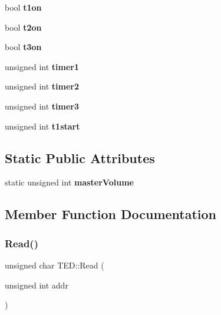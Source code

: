 \begin{DoxyCompactItemize}
\item 
\mbox{\label{class_t_e_d_a5cc45690ae8cb66632d1dd214371b912}} 
bool {\bfseries t1on}
\item 
\mbox{\label{class_t_e_d_a5970c346b3d7d52bde78a500f5aee1f4}} 
bool {\bfseries t2on}
\item 
\mbox{\label{class_t_e_d_a962fb4b04b46b48b5dd36c7a2bc7fb09}} 
bool {\bfseries t3on}
\item 
\mbox{\label{class_t_e_d_a77293433aaf5e876b9b01a767e7e338f}} 
unsigned int {\bfseries timer1}
\item 
\mbox{\label{class_t_e_d_a43098e1aaf59e66098bbfc281e3a58a3}} 
unsigned int {\bfseries timer2}
\item 
\mbox{\label{class_t_e_d_a1c9b720fa1f57c6acbc6cf67b59b6d75}} 
unsigned int {\bfseries timer3}
\item 
\mbox{\label{class_t_e_d_ae07af33401c0df366547f7da11ca08ec}} 
unsigned int {\bfseries t1start}
\end{DoxyCompactItemize}
\subsection*{Static Public Attributes}
\begin{DoxyCompactItemize}
\item 
\mbox{\label{class_t_e_d_a317c1e32175a7a66a1818a859e9b8cbc}} 
static unsigned int {\bfseries master\+Volume}
\end{DoxyCompactItemize}


\subsection{Member Function Documentation}
\mbox{\label{class_t_e_d_a15d3c4cf86452dc0599d6dd504fa832f}} 
\subsubsection{\texorpdfstring{Read()}{Read()}}
{\footnotesize\ttfamily unsigned char T\+E\+D\+::\+Read (\begin{DoxyParamCaption}\item[{unsigned int}]{addr }\end{DoxyParamCaption})\hspace{0.3cm}{\ttfamily [virtual]}}

